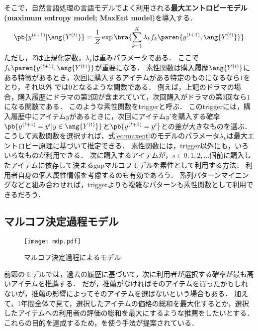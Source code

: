 そこで，自然言語処理の言語モデルでよく利用される\textbf{最大エントロピーモデル (maximum entropy model; MaxEnt model)}を導入する．
\begin{equation}
\pb{y^{(t+1)}|\ang{Y^{(t)}}}=
\frac{1}{Z}
\exp\bra{\sum_{k=1}^K\lambda_k f_k\paren{y^{(t+1)},\ang{Y^{(t)}}}}
\label{eq:maxent}
\end{equation}
ただし，$Z$は正規化定数，$\lambda_k$は重みパラメータである．
ここで $f_k\paren{y^{(t+1)},\ang{Y^{(t)}}}$が重要になる．
素性関数は購入履歴$\ang{Y^{(t)}}$にある特徴があるとき，次回に購入するアイテムがある特定のものになるなら$1$をとり，それ以外
では$0$となるような関数である．
例えば，上記のドラマの場合，購入履歴にドラマの第2回が含まれていて，次回購入がドラマの第3回なら$1$になる関数である．
このような素性関数をtriggerと呼ぶ．
このtriggerには，購入履歴中にアイテム$y$があるときに，次回にアイテム$y'$を購入する確率
$\pb{y^{(t+1)}=y'|y\in \ang{Y^{(t)}}}$と$\pb{y^{(t+1)}=y'}$との差が大きなものを選ぶ．
こうして素数関数を選択すれば，式\eqref{eq:maxent}のモデルのパラメータ$\lambda_k$は最大エントロピー原理\cite{jb:031:00}に基づいて推定できる．
素性関数には，trigger以外にも，いろいろなものが利用できる．
次に購入するアイテムが，$s\in{0,1,2,\dotsc}$個前に購入したアイテムに依存して決まるgapマルコフモデルを素性として利用する方法\cite{trieice:07:01}．
利用者自身の個人属性情報を考慮するのも有効であろう．
系列パターンマイニング\cite{eb:044:00,icde:01:02}などと組み合わせれば，triggerよりも複雑なパターンも素性関数として利用できるだろう．

\subsection{マルコフ決定過程モデル}

\begin{figure}
\centering
\texttt{[image: mdp.pdf]}
\caption{マルコフ決定過程によるモデル}
\label{fig:mdpmodel}
\end{figure}

前節のモデルでは，過去の履歴に基づいて，次に利用者が選択する確率が最も高いアイテムを推薦する．
だが，推薦がなければそのアイテムを買ったかもしれないが，推薦の影響によってそのアイテムを選ばないという場合もある．
加えて，1年間全体で見て，選択したアイテムの価格の総和を最大化するとか，選択したアイテムへの利用者の評価の総和を最大にするような推薦をしたいとする．
これらの目的を達成するため，を使う手法が提案されている\cite{uai:02:02,jmlr:05:03}．

